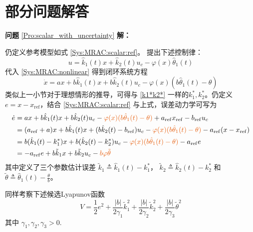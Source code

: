 \chapter{部分问题解答} \label{Problems}

\noindent\textbf{问题} \ref{Pro:scalar_with_uncertainty} \textbf{解：}

仍定义参考模型如式 \eqref{Sys:MRAC:scalar:ref}。
提出下述控制律：
\[ u =  \hat{k}_1 (t) x + \hat{k}_2 (t) u_c - \varphi (x) \hat{\theta}_1 (t) \]
代入 \eqref{Sys:MRAC:nonlinear} 得到闭环系统方程
\begin{equation*}
    \dot{x} = a  x +  b \hat{k}_1 (t) x + b \hat{k}_2 (t) u_c -  \varphi  (x) (b\hat{\theta}_1 (t) - \theta) 
\end{equation*}
类似上一小节对于理想情形的推导，可得与 \eqref{k1*k2*} 一样的$k^{\ast}_1, k^{\ast}_2$。仍定义$e=x-x_{\operatorname{ref}}$，结合 \eqref{Sys:MRAC:scalar:ref} 与上式，误差动力学可写为
\begin{align}
  \dot{e} & =  a  x +  b \hat{k}_1 (t) x + b \hat{k}_2 (t) u_c -\textcolor{second}{  \varphi  (x) (b\hat{\theta}_1 (t) - \theta) }+ a_{\ensuremath{\operatorname{ref}}}
  x_{\ensuremath{\operatorname{ref}}} - b_{\ensuremath{\operatorname{ref}}}
  u_c \nonumber\\
  & = (a_{\ensuremath{\operatorname{ref}}} + a) x +  b \hat{k}_1 (t) x +
  (b \hat{k}_2 (t) - b_{\ensuremath{\operatorname{ref}}}) u_c -  \textcolor{second}{\varphi (x)
  (b\hat{\theta}_1 (t) - \theta)} - a_{\ensuremath{\operatorname{ref}}} (x-x_{\operatorname{ref}})
  \nonumber\\
  & =  b (\hat{k}_1 (t) - k^{\ast}_1) x + b (\hat{k}_2 (t) - k^{\ast}_2)
  u_c -  \textcolor{second}{\varphi (x) (b\hat{\theta}_1 (t) - \theta)} -
  a_{\ensuremath{\operatorname{ref}}} e \nonumber\\
  & =  - a_{\ensuremath{\operatorname{ref}}} e + b \tilde{k}_1 x + b
  \tilde{k}_2 u_c - \textcolor{second}{b \varphi \tilde{\theta}} \label{Pro:err:MRAC:nonlinear}
\end{align}
其中定义了三个参数估计误差 $\tilde{k}_1 \triangleq \hat{k}_1 (t) - k^{\ast}_1$， $\tilde{k}_2 \triangleq \hat{k}_2
(t) - k^{\ast}_2$ 和 \textcolor{second}{$\tilde{\theta} \triangleq\hat{\theta}_1 (t) - \frac{\theta}{b}$}。

同样考察下述候选Lyapunov函数
\begin{equation*}
  V = \frac{1}{2} e^2 + \frac{| b |}{2 \gamma_1} \tilde{k}^2_1 + \frac{| b
  |}{2 \gamma_2} \tilde{k}^2_2 + \frac{| b |}{2 \gamma_3} \tilde{\theta}^2 
\end{equation*}
其中 $\gamma_1, \gamma_2, \gamma_3 > 0$.

